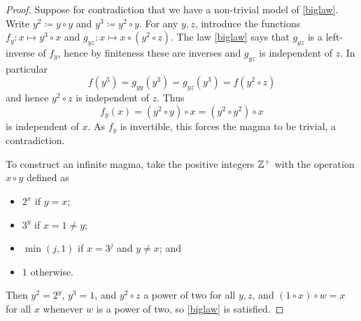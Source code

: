 \begin{proof} \leanok  Suppose for contradiction that we have a non-trivial model of \eqref{biglaw}. Write $y^2 \coloneqq y \circ y$ and $y^3 \coloneqq y^2 \circ y$. For any $y,z$, introduce the functions $f_y: x \mapsto y^3 \circ x$ and $g_{yz}: x \mapsto x \circ (y^2 \circ z)$.  The law \eqref{biglaw} says that $g_{yz}$ is a left-inverse of $f_y$, hence by finiteness these are inverses and $g_{yz}$ is independent of $z$. In particular
$$ f(y^3) = g_{yy}(y^3) = g_{yz}(y^3) = f(y^2 \circ z)$$
and hence $y^2 \circ z$ is independent of $z$.  Thus
$$ f_y(x) = (y^2 \circ y) \circ x = (y^2 \circ y^2) \circ x$$
is independent of $x$.  As $f_y$ is invertible, this forces the magma to be trivial, a contradiction.

To construct an infinite magma, take the positive integers $\mathbb{Z}^+$ with the operation $x \circ y$ defined as
\begin{itemize}
  \item $2^x$ if $y=x$;
  \item $3^y$ if $x = 1 \neq y$;
  \item $\min(j,1)$ if $x=3^j$ and $y \neq x$; and
  \item $1$ otherwise.
\end{itemize}
Then $y^2 = 2^y$, $y^3 = 1$, and $y^2 \circ z$ a power of two for all $y, z$, and $(1 \circ x) \circ w = x$ for all $x$ whenever $w$ is a power of two, so \eqref{biglaw} is satisfied.
\end{proof}
